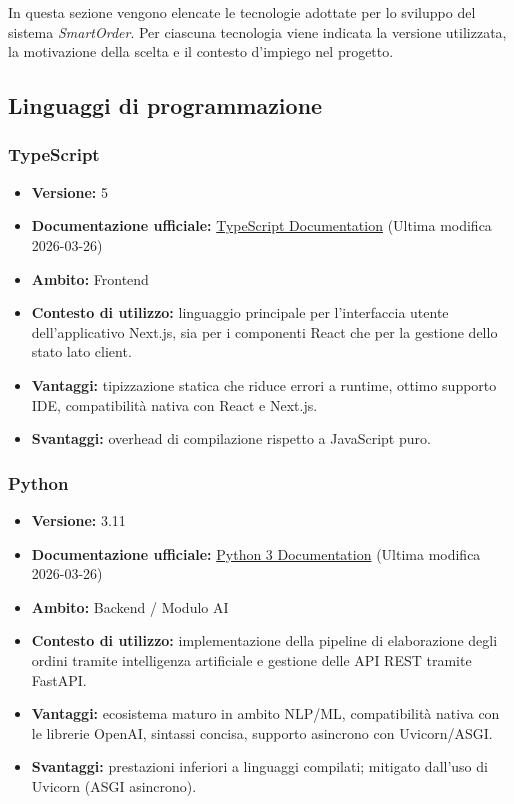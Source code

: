 \documentclass[a4paper, 11pt, oneside]{scrartcl}
\begin{document}
In questa sezione vengono elencate le tecnologie adottate per lo sviluppo del sistema \textit{SmartOrder}. Per ciascuna tecnologia viene indicata la versione utilizzata, la motivazione della scelta e il contesto d'impiego nel progetto.

\subsection{Linguaggi di programmazione}

\subsubsection{TypeScript}
\begin{itemize}[noitemsep]
\item \textbf{Versione:} 5
\item \textbf{Documentazione ufficiale:} \href{https://www.typescriptlang.org/docs/}{TypeScript
 Documentation} (Ultima modifica 2026-03-26)
\item \textbf{Ambito:} Frontend
\item \textbf{Contesto di utilizzo:} linguaggio principale per l'interfaccia utente dell'applicativo Next.js, sia per i componenti React che per la gestione dello stato lato client.
\item \textbf{Vantaggi:} tipizzazione statica che riduce errori a runtime, ottimo supporto IDE, compatibilit\`a nativa con React e Next.js.
\item \textbf{Svantaggi:} overhead di compilazione rispetto a JavaScript puro.
\end{itemize}

\subsubsection{Python}
\begin{itemize}[noitemsep]
\item \textbf{Versione:} 3.11
\item \textbf{Documentazione ufficiale:} \href{https://docs.python.org/3/}{Python 3 Documentation} (Ultima modifica 2026-03-26)
\item \textbf{Ambito:} Backend / Modulo AI
\item \textbf{Contesto di utilizzo:} implementazione della pipeline di elaborazione degli ordini tramite intelligenza artificiale e gestione delle API REST tramite FastAPI.
\item \textbf{Vantaggi:} ecosistema maturo in ambito NLP/ML, compatibilit\`a nativa con le librerie OpenAI, sintassi concisa, supporto asincrono con Uvicorn/ASGI.
\item \textbf{Svantaggi:} prestazioni inferiori a linguaggi compilati; mitigato dall'uso di Uvicorn (ASGI asincrono).
\end{itemize}
\end{document}
